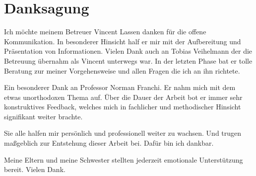 \chapter{Danksagung}
%
Ich möchte meinem Betreuer Vincent Lassen danken für die offene Kommunikation.
In besonderer Hinsicht half er mir mit der Aufbereitung und Präsentation von Informationen.
Vielen Dank auch an Tobias Veihelmann der die Betreuung übernahm als Vincent unterwegs war.
In der letzten Phase bat er tolle Beratung zur meiner Vorgehensweise und allen Fragen die ich an ihn richtete.

Ein besonderer Dank an Professor Norman Franchi.
Er nahm mich mit dem etwas unorthodoxen Thema auf.
Über die Dauer der Arbeit bot er immer sehr konstruktives Feedback, welches mich in fachlicher und methodischer Hinsicht signifikant weiter brachte.

Sie alle halfen mir persönlich und professionell weiter zu wachsen.
Und trugen maßgeblich zur Entstehung dieser Arbeit bei.
Dafür bin ich dankbar.

Meine Eltern und meine Schwester stellten jederzeit emotionale Unterstützung bereit.
Vielen Dank.
